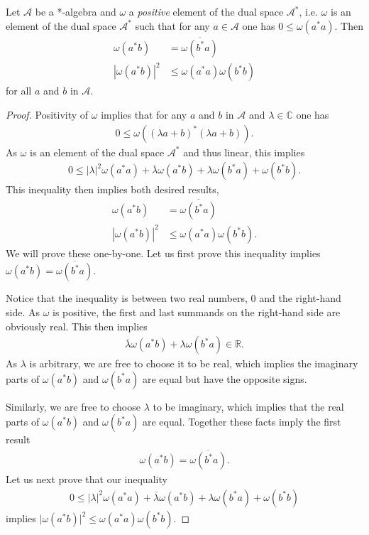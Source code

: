 \begin{lemma}
    \label{lmm:cauchy-schwarz-inequality}
    \leanok
    Let $\mathcal{A}$ be a *-algebra and $\omega$ a \textit{positive} element of the dual space $\mathcal{A}^*$, i.e. $\omega$ is an element of the dual space $\mathcal{A}^*$ such that for any $a \in \mathcal{A}$ one has $0 \le \omega(a^*a)$. Then
    \begin{align}
        \omega(a^*b) &= \overline{\omega(b^*a)} \\
        |\omega(a^*b)|^2 &\le \omega(a^*a) \omega(b^*b)
    \end{align}
    for all $a$ and $b$ in $\mathcal{A}$.
\end{lemma}
\begin{proof}
Positivity of $\omega$ implies that for any $a$ and $b$ in $\mathcal{A}$ and $\lambda \in \mathbb{C}$ one has
\begin{align}
    0 \le \omega\left((\lambda a + b)^*(\lambda a + b)\right).
\end{align}
As $\omega$ is an element of the dual space $\mathcal{A}^*$ and thus linear, this implies
\begin{align}
    0 \le |\lambda|^2\omega(a^*a) + \overline{\lambda}\omega(a^*b) + \lambda\omega(b^*a) + \omega(b^*b).
\end{align}
This inequality then implies both desired results,
\begin{align}
    \omega(a^*b) &= \overline{\omega(b^*a)} \\
    |\omega(a^*b)|^2 &\le \omega(a^*a) \omega(b^*b).
\end{align}
We will prove these one-by-one. Let us first prove this inequality implies $\omega(a^*b) = \overline{\omega(b^*a)}$.

Notice that the inequality is between two real numbers, $0$ and the right-hand side. As $\omega$ is positive, the first and last summands on the right-hand side are obviously real. This then implies
\begin{align}
    \overline{\lambda}\omega(a^*b) + \lambda\omega(b^*a) \in \mathbb{R}.
\end{align}
As $\lambda$ is arbitrary, we are free to choose it to be real, which implies the imaginary parts of $\omega(a^*b)$ and $\omega(b^*a)$ are equal but have the opposite signs.

Similarly, we are free to choose $\lambda$ to be imaginary, which implies that the real parts of $\omega(a^*b)$ and $\omega(b^*a)$ are equal. Together these facts imply the first result
\begin{align}
    \omega(a^*b) = \overline{\omega(b^*a)}.
\end{align}
Let us next prove that our inequality
\begin{align}
    0 \le |\lambda|^2\omega(a^*a) + \overline{\lambda}\omega(a^*b) + \lambda\omega(b^*a) + \omega(b^*b)
\end{align}
implies $\lvert \omega(a^*b) \rvert^2 \le \omega(a^*a) \omega(b^*b)$.


\end{proof}
